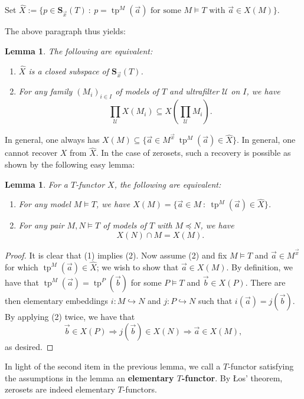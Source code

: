 \documentclass[12pt]{amsart}
\newtheorem{lem}[thm]{Lemma}
\theoremstyle{definition}
\def\u{\mathsf 1}
\def \tp{\operatorname{tp}}
\def \u{\mathcal U}
\begin{document}
Set $\hat X:=\{p\in \mathbf{S}_{\vec x}(T) \ : \ p=\tp^M(\vec a) \text{ for some }M\models T \text{ with }\vec a\in X(M)\}$.  

The above paragraph thus yields:

\begin{lem}\label{closedlemma}
The following are equivalent:
\begin{enumerate}
    \item $\hat X$ is a closed subspace of $\mathbf{S}_{\vec x}(T)$.
    \item For any family $(M_i)_{i\in I}$ of models of $T$ and ultrafilter $\u$ on $I$, we have $$\prod_\u X(M_i)\subseteq X(\prod_\u M_i).$$
\end{enumerate}
\end{lem}

In general, one always has $X(M)\subseteq \{\vec a\in M^{\vec x} \ \tp^M(\vec a)\in \hat X\}$.  In general, one cannot recover $X$ from $\hat X$.  In the case of zerosets, such a recovery is possible as shown by the following easy lemma:

\begin{lem}
For a $T$-functor $X$, the following are equivalent:
\begin{enumerate}
\item For any model $M\models T$, we have $X(M)=\{\vec a\in M \ : \ \tp^M(\vec a)\in \hat X\}$.
\item For any pair $M,N\models T$ of models of $T$ with $M\preceq N$, we have $$X(N)\cap M=X(M).$$
\end{enumerate}
\end{lem}

\begin{proof}
It is clear that (1) implies (2).  Now assume (2) and fix $M\models T$ and $\vec a\in M^{\vec x}$ for which $\tp^M(\vec a)\in \hat X$; we wish to show that $\vec a\in X(M)$.  By definition, we have that $\tp^M(\vec a)=\tp^P(\vec b)$ for some $P\models T$ and $\vec b\in X(P)$.  There are then elementary embeddings $i:M\hookrightarrow N$ and $j:P\hookrightarrow N$ such that $i(\vec a)=j(\vec b)$.  By applying (2) twice, we have that 
$$\vec b\in X(P)\Rightarrow j(\vec b)\in X(N)\Rightarrow \vec a\in X(M),$$ as desired.
\end{proof}

In light of the second item in the previous lemma, we call a $T$-functor satisfying the assumptions in the lemma an \textbf{elementary $T$-functor}.  By \L os' theorem, zerosets are indeed elementary $T$-functors.
\end{document}

